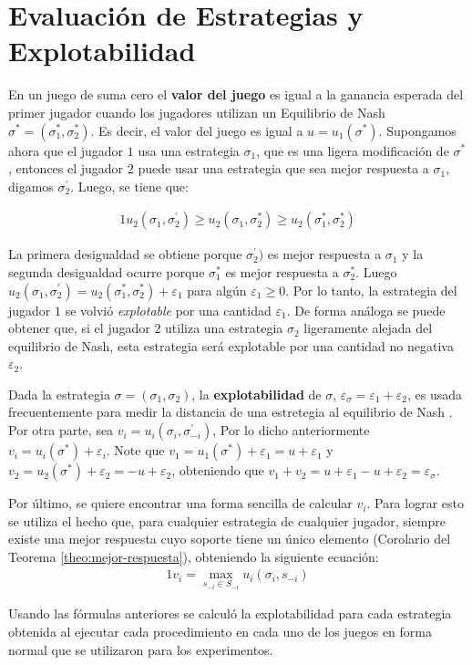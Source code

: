 \section{Evaluación de Estrategias y Explotabilidad}
\label{section:explotabilidad}

En un juego de suma cero el \textbf{valor del juego} es igual a la ganancia esperada del primer jugador cuando los jugadores utilizan un Equilibrio de Nash $\sigma^* = (\sigma^*_1, \sigma^*_2)$. Es decir, el valor del juego es igual a $u = u_1(\sigma^*)$. Supongamos ahora que el jugador $1$  usa una estrategia $\sigma_1$, que es una ligera modificación de $\sigma^*$, entonces el jugador $2$ puede usar una estrategia que sea mejor respuesta a $\sigma_1$, digamos $\sigma^{\prime}_2$. Luego, se tiene que:

\begin{alignat}{1}
u_2(\sigma_1, \sigma^{\prime}_2) \geq u_2(\sigma_1, \sigma^*_2) \geq u_2(\sigma^*_1, \sigma^*_2)
\end{alignat}

La primera desigualdad se obtiene porque $\sigma^{\prime}_2)$ es mejor respuesta a $\sigma_1$ y la segunda desigualdad ocurre porque $\sigma^*_1$ es mejor respuesta a $\sigma^*_2$. Luego $u_2(\sigma_1, \sigma^{\prime}_2) = u_2(\sigma^*_1, \sigma^*_2) + \varepsilon_1$ para algún $\varepsilon_1 \geq 0$. Por lo tanto, la estrategia del jugador $1$ se volvió \textit{explotable} por una cantidad $\varepsilon_1$. De forma análoga se puede obtener que, si el jugador $2$ utiliza una estrategia $\sigma_2$ ligeramente alejada del equilibrio de Nash, esta estrategia será explotable por una cantidad no negativa $\varepsilon_2$.

Dada la estrategia $\sigma = (\sigma_1, \sigma_2)$, la \textbf{explotabilidad} de $\sigma$, $\varepsilon_{\sigma} = \varepsilon_1 + \varepsilon_2$, es usada frecuentemente para medir la distancia de una estretegia al equilibrio de Nash \cite[p. 7]{bib:thesis-marc-lanctot}. Por otra parte, sea $v_i = u_i(\sigma_i, \sigma^{\prime}_{-i})$, Por lo dicho anteriormente $v_i = u_i(\sigma^*) + \varepsilon_i$. Note que $v_1 = u_1(\sigma^*) + \varepsilon_1 = u + \varepsilon_1$ y $v_2 = u_2(\sigma^*) + \varepsilon_2 = -u + \varepsilon_2$, obteniendo que $v_1 + v_2 = u + \varepsilon_1 - u + \varepsilon_2 = \varepsilon_{\sigma}$.

Por último, se quiere encontrar una forma sencilla de calcular $v_i$. Para lograr esto se utiliza el hecho que, para cualquier estrategia de cualquier jugador, siempre existe una mejor respuesta cuyo soporte tiene un único elemento (Corolario del Teorema \ref{theo:mejor-respuesta}), obteniendo la siguiente ecuación:
\begin{alignat}{1}
v_i = \max_{s_{-i} \in S_{-i}} u_i(\sigma_i, s_{-i})
\end{alignat}

Usando las fórmulas anteriores se calculó la explotabilidad para cada estrategia obtenida al ejecutar cada procedimiento en cada uno de los juegos en forma normal que se utilizaron para los experimentos.
